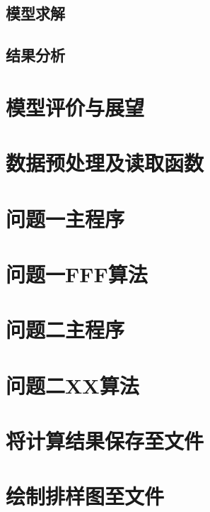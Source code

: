 \documentclass[bwprint]{gmcmthesis}
\begin{document}
\subsection{模型求解}

\subsection{结果分析}

\section{模型评价与展望}


\newpage
\quad
\newpage





\cite{mittelbach_latex_2004,wright_latex3_2009,beeton_unicode_2008,vieth_experiences_2009}

\newpage
\appendix
\setcounter{page}{1} %
\section{数据预处理及读取函数}

\section{问题一主程序}

\section{问题一FFF算法}

\section{问题二主程序}

\section{问题二XX算法}

\section{将计算结果保存至文件}

\section{绘制排样图至文件}

\end{document}

